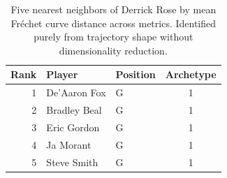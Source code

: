 \begin{table}[htbp]
  \centering\small
  \begin{tabular}{rllc}
    \toprule
    Rank & Player & Position & Archetype \\
    \midrule
    1 & De'Aaron Fox & G & 1 \\
    2 & Bradley Beal & G & 1 \\
    3 & Eric Gordon & G & 1 \\
    4 & Ja Morant & G & 1 \\
    5 & Steve Smith & G & 1 \\
    \bottomrule
  \end{tabular}
  \caption{Five nearest neighbors of Derrick Rose by mean Fr\'{e}chet curve distance across metrics. Identified purely from trajectory shape without dimensionality reduction.}
  \label{tab:Derrick_Rose_frechet_curve_neighbors}
\end{table}

